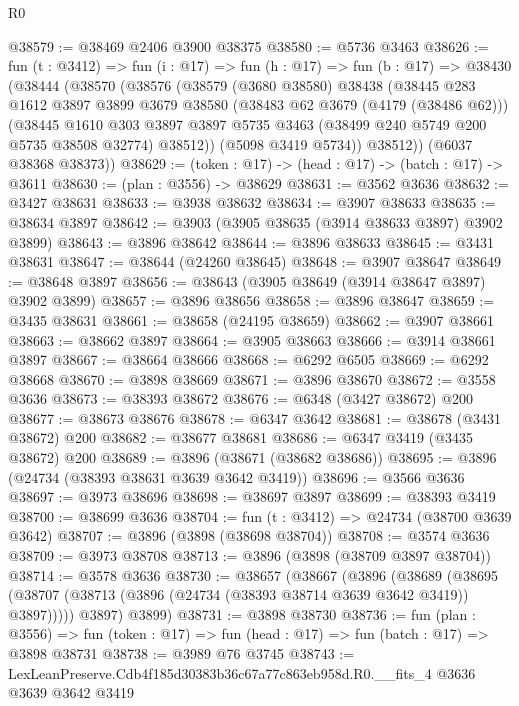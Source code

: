 \begin{lexlean}{R0}
\begin{coremodule}
@38579 := @38469 @2406 @3900 @38375
@38580 := @5736 @3463
@38626 := fun (t : @3412) =>
  fun (i : @17) =>
  fun (h : @17) =>
  fun (b : @17) =>
  @38430
    (@38444
      (@38570
        (@38576
          (@38579
            (@3680 @38580)
            @38438
            (@38445
              @283
              @1612
              @3897
              @3899
              @3679
              @38580
              (@38483 @62 @3679 (@4179 (@38486 @62)))
              (@38445
                @1610
                @303
                @3897
                @3897
                @5735
                @3463
                (@38499 @240 @5749 @200 @5735 @38508 @32774)
                @38512))
            (@5098 @3419 @5734))
          @38512))
      (@6037 @38368 @38373))
@38629 := (token : @17) -> (head : @17) -> (batch : @17) -> @3611
@38630 := (plan : @3556) -> @38629
@38631 := @3562 @3636
@38632 := @3427 @38631
@38633 := @3938 @38632
@38634 := @3907 @38633
@38635 := @38634 @3897
@38642 := @3903 (@3905 @38635 (@3914 @38633 @3897) @3902 @3899)
@38643 := @3896 @38642
@38644 := @3896 @38633
@38645 := @3431 @38631
@38647 := @38644 (@24260 @38645)
@38648 := @3907 @38647
@38649 := @38648 @3897
@38656 := @38643 (@3905 @38649 (@3914 @38647 @3897) @3902 @3899)
@38657 := @3896 @38656
@38658 := @3896 @38647
@38659 := @3435 @38631
@38661 := @38658 (@24195 @38659)
@38662 := @3907 @38661
@38663 := @38662 @3897
@38664 := @3905 @38663
@38666 := @3914 @38661 @3897
@38667 := @38664 @38666
@38668 := @6292 @6505
@38669 := @6292 @38668
@38670 := @3898 @38669
@38671 := @3896 @38670
@38672 := @3558 @3636
@38673 := @38393 @38672
@38676 := @6348 (@3427 @38672) @200
@38677 := @38673 @38676
@38678 := @6347 @3642
@38681 := @38678 (@3431 @38672) @200
@38682 := @38677 @38681
@38686 := @6347 @3419 (@3435 @38672) @200
@38689 := @3896 (@38671 (@38682 @38686))
@38695 := @3896 (@24734 (@38393 @38631 @3639 @3642 @3419))
@38696 := @3566 @3636
@38697 := @3973 @38696
@38698 := @38697 @3897
@38699 := @38393 @3419
@38700 := @38699 @3636
@38704 := fun (t : @3412) => @24734 (@38700 @3639 @3642)
@38707 := @3896 (@3898 (@38698 @38704))
@38708 := @3574 @3636
@38709 := @3973 @38708
@38713 := @3896 (@3898 (@38709 @3897 @38704))
@38714 := @3578 @3636
@38730 := @38657
    (@38667
      (@3896
        (@38689 (@38695 (@38707 (@38713 (@3896 (@24734 (@38393 @38714 @3639 @3642 @3419)) @3897)))))
        @3897)
      @3899)
@38731 := @3898 @38730
@38736 := fun (plan : @3556) =>
  fun (token : @17) => fun (head : @17) => fun (batch : @17) => @3898 @38731
@38738 := @3989 @76 @3745
@38743 := LexLeanPreserve.Cdb4f185d30383b36c67a77c863eb958d.R0.__fits_4 @3636 @3639 @3642 @3419

\end{coremodule}
\end{lexlean}
